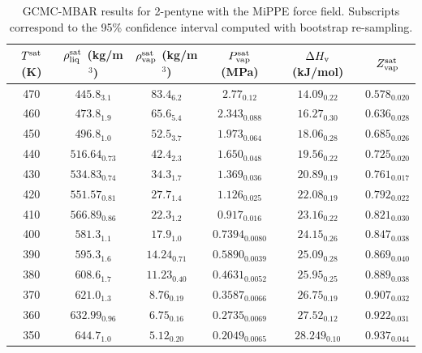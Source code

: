 \documentclass[journal=jctc,manuscript=article]{achemso}
\begin{document}
\begin{table}[htb!]
	\caption{GCMC-MBAR results for 2-pentyne with the MiPPE force field. Subscripts correspond to the 95\% confidence interval computed with bootstrap re-sampling.}
	\begin{center}
		\begin{tabular}{|c|c|c|c|c|c|}
			\hline
			$T^{\rm sat}$ (K) & $\rho_{\rm liq}^{\rm sat}$ (kg/m$^3$) & $\rho_{\rm vap}^{\rm sat}$ (kg/m$^3$) & $P_{\rm vap}^{\rm sat}$ (MPa) & $\Delta H_{\rm v}$ (kJ/mol) & $Z_{\rm vap}^{\rm sat}$ \\ \hline
			470 & $445.8_{3.1}$ & $83.4_{6.2}$ & $2.77_{0.12}$ & $14.09_{0.22}$ & $0.578_{0.020}$ \\
			460 & $473.8_{1.9}$ & $65.6_{5.4}$ & $2.343_{0.088}$ & $16.27_{0.30}$ & $0.636_{0.028}$ \\
			450 & $496.8_{1.0}$ & $52.5_{3.7}$ & $1.973_{0.064}$ & $18.06_{0.28}$ & $0.685_{0.026}$ \\
			440 & $516.64_{0.73}$ & $42.4_{2.3}$ & $1.650_{0.048}$ & $19.56_{0.22}$ & $0.725_{0.020}$ \\
			430 & $534.83_{0.74}$ & $34.3_{1.7}$ & $1.369_{0.036}$ & $20.89_{0.19}$ & $0.761_{0.017}$ \\
			420 & $551.57_{0.81}$ & $27.7_{1.4}$ & $1.126_{0.025}$ & $22.08_{0.19}$ & $0.792_{0.022}$ \\
			410 & $566.89_{0.86}$ & $22.3_{1.2}$ & $0.917_{0.016}$ & $23.16_{0.22}$ & $0.821_{0.030}$ \\
			400 & $581.3_{1.1}$ & $17.9_{1.0}$ & $0.7394_{0.0080}$ & $24.15_{0.26}$ & $0.847_{0.038}$ \\
			390 & $595.3_{1.6}$ & $14.24_{0.71}$ & $0.5890_{0.0039}$ & $25.09_{0.28}$ & $0.869_{0.040}$ \\
			380 & $608.6_{1.7}$ & $11.23_{0.40}$ & $0.4631_{0.0052}$ & $25.95_{0.25}$ & $0.889_{0.038}$ \\
			370 & $621.0_{1.3}$ & $8.76_{0.19}$ & $0.3587_{0.0066}$ & $26.75_{0.19}$ & $0.907_{0.032}$ \\
			360 & $632.99_{0.96}$ & $6.75_{0.16}$ & $0.2735_{0.0069}$ & $27.52_{0.12}$ & $0.922_{0.031}$ \\
			350 & $644.7_{1.0}$ & $5.12_{0.20}$ & $0.2049_{0.0065}$ & $28.249_{0.10}$ & $0.937_{0.044}$ \\
			\hline
		\end{tabular}
	\end{center}
\end{table}
\end{document}
